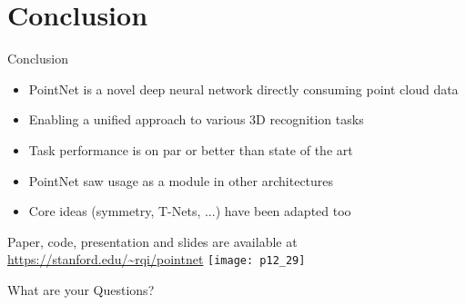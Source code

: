 \section{Conclusion}

\begin{frame}[c]{Conclusion}
    \begin{multicols}{2}
        \begin{itemize}
            \item PointNet is a novel deep neural network directly consuming point cloud data
            \item Enabling a unified approach to various 3D recognition tasks
            \item Task performance is on par or better than state of the art
            \item PointNet saw usage as a module in other architectures
            \item Core ideas (symmetry, T-Nets, ...) have been adapted too
        \end{itemize}
        Paper, code, presentation and slides are available at \url{https://stanford.edu/~rqi/pointnet}
        \texttt{[image: p12\_29]}
    \end{multicols}
\end{frame}


\begin{frame}[c]
    \Huge
    \begin{centering}
        What are your Questions?
    \end{centering}
\end{frame}
